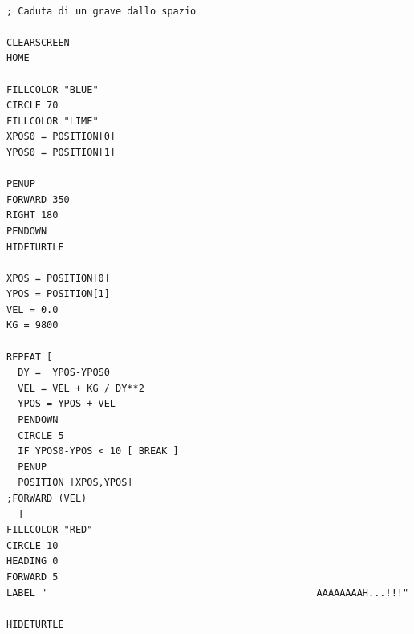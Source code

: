\lstset{extendedchars=true, basicstyle=\scriptsize} 
\begin{lstlisting}[frame=single]  % Start your code-block

; Caduta di un grave dallo spazio

CLEARSCREEN
HOME

FILLCOLOR "BLUE"
CIRCLE 70
FILLCOLOR "LIME"
XPOS0 = POSITION[0]
YPOS0 = POSITION[1]

PENUP
FORWARD 350
RIGHT 180
PENDOWN
HIDETURTLE

XPOS = POSITION[0]
YPOS = POSITION[1]
VEL = 0.0
KG = 9800

REPEAT [
  DY =  YPOS-YPOS0
  VEL = VEL + KG / DY**2
  YPOS = YPOS + VEL
  PENDOWN
  CIRCLE 5
  IF YPOS0-YPOS < 10 [ BREAK ]
  PENUP
  POSITION [XPOS,YPOS]
;FORWARD (VEL)
  ]
FILLCOLOR "RED"
CIRCLE 10
HEADING 0
FORWARD 5
LABEL "                                               AAAAAAAAH...!!!"                      

HIDETURTLE
\end{lstlisting}

